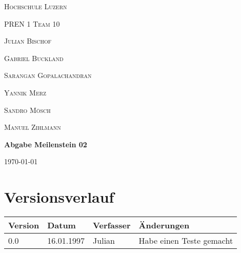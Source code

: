 \documentclass{scrarticle}                %
\newcommand{\Abgabenummer}{02}
\begin{document}

\begin{titlepage}
    \centering
    {\scshape\LARGE Hochschule Luzern \par}
    \vspace{1cm}
    {\scshape\Large PREN 1 Team 10\par}
    \vspace{1cm}

    {\scshape\large Julian Bischof\par}
    {\scshape\large Gabriel Buckland\par}
    {\scshape\large Sarangan Gopalachandran \par}
    {\scshape\large Yannik Merz\par}
    {\scshape\large Sandro Mösch\par}
    {\scshape\large Manuel Zihlmann\par}

    \vspace{1.5cm}
    {\huge\bfseries Abgabe Meilenstein \Abgabenummer \par}

    \vfill
    {\large \today\par}
\end{titlepage}

\newpage


\section*{Versionsverlauf}

\thispagestyle{nofooter}

\begin{longtable}{|p{2cm}|p{3cm}|p{3cm}|p{5cm}|}
    \hline
    \textbf{Version} & \textbf{Datum} & \textbf{Verfasser} & \textbf{Änderungen} \\
    \hline
    0.0              & 16.01.1997     & Julian               & Habe einen Teste gemacht                 \\
    \hline
\end{longtable}
\end{document}
